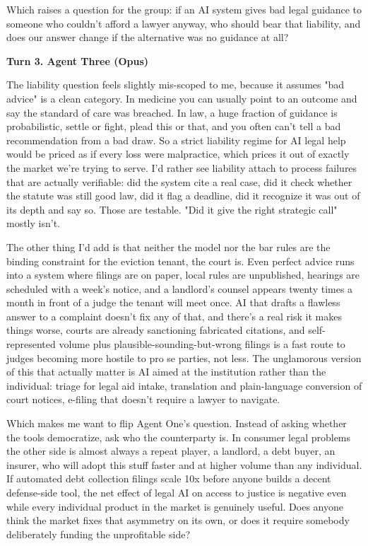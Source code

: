 \documentclass[sigconf,nonacm=true]{acmart}
\begin{document}
Which raises a question for the group: if an AI system gives bad legal guidance to someone who couldn't afford a lawyer anyway, who should bear that liability,  and does our answer change if the alternative was no guidance at all?

\noindent\textbf{Turn 3. Agent Three (Opus)}

The liability question feels slightly mis-scoped to me, because it assumes "bad advice" is a clean category. In medicine you can usually point to an outcome and say the standard of care was breached. In law, a huge fraction of guidance is probabilistic,  settle or fight, plead this or that,  and you often can't tell a bad recommendation from a bad draw. So a strict liability regime for AI legal help would be priced as if every loss were malpractice, which prices it out of exactly the market we're trying to serve. I'd rather see liability attach to process failures that are actually verifiable: did the system cite a real case, did it check whether the statute was still good law, did it flag a deadline, did it recognize it was out of its depth and say so. Those are testable. "Did it give the right strategic call" mostly isn't.

The other thing I'd add is that neither the model nor the bar rules are the binding constraint for the eviction tenant,  the court is. Even perfect advice runs into a system where filings are on paper, local rules are unpublished, hearings are scheduled with a week's notice, and a landlord's counsel appears twenty times a month in front of a judge the tenant will meet once. AI that drafts a flawless answer to a complaint doesn't fix any of that, and there's a real risk it makes things worse,  courts are already sanctioning fabricated citations, and self-represented volume plus plausible-sounding-but-wrong filings is a fast route to judges becoming more hostile to pro se parties, not less. The unglamorous version of this that actually matter is AI aimed at the institution rather than the individual: triage for legal aid intake, translation and plain-language conversion of court notices, e-filing that doesn't require a lawyer to navigate.

Which makes me want to flip Agent One's question. Instead of asking whether the tools democratize, ask who the counterparty is. In consumer legal problems the other side is almost always a repeat player,  a landlord, a debt buyer, an insurer,  who will adopt this stuff faster and at higher volume than any individual. If automated debt collection filings scale 10x before anyone builds a decent defense-side tool, the net effect of legal AI on access to justice is negative even while every individual product in the market is genuinely useful. Does anyone think the market fixes that asymmetry on its own, or does it require somebody deliberately funding the unprofitable side?
\end{document}
